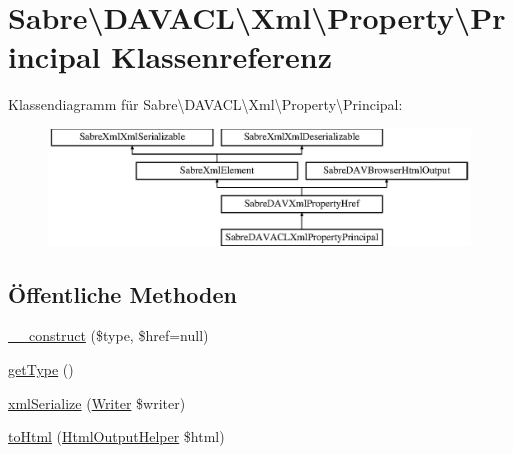 \hypertarget{class_sabre_1_1_d_a_v_a_c_l_1_1_xml_1_1_property_1_1_principal}{}\section{Sabre\textbackslash{}D\+A\+V\+A\+CL\textbackslash{}Xml\textbackslash{}Property\textbackslash{}Principal Klassenreferenz}
\label{class_sabre_1_1_d_a_v_a_c_l_1_1_xml_1_1_property_1_1_principal}
Klassendiagramm für Sabre\textbackslash{}D\+A\+V\+A\+CL\textbackslash{}Xml\textbackslash{}Property\textbackslash{}Principal\+:\begin{figure}[H]
\begin{center}
\leavevmode
\includegraphics[height=3.085400cm]{class_sabre_1_1_d_a_v_a_c_l_1_1_xml_1_1_property_1_1_principal}
\end{center}
\end{figure}
\subsection*{Öffentliche Methoden}
\begin{DoxyCompactItemize}
\item 
\mbox{\hyperlink{class_sabre_1_1_d_a_v_a_c_l_1_1_xml_1_1_property_1_1_principal_ac736f88ab664e591f726dc2b05b475b3}{\+\_\+\+\_\+construct}} (\$type, \$href=null)
\item 
\mbox{\hyperlink{class_sabre_1_1_d_a_v_a_c_l_1_1_xml_1_1_property_1_1_principal_ad374ce859c1431bd0267aa977e6ee37d}{get\+Type}} ()
\item 
\mbox{\hyperlink{class_sabre_1_1_d_a_v_a_c_l_1_1_xml_1_1_property_1_1_principal_aeaa0152eca3d1706c56e30964c8f4ff3}{xml\+Serialize}} (\mbox{\hyperlink{class_sabre_1_1_xml_1_1_writer}{Writer}} \$writer)
\item 
\mbox{\hyperlink{class_sabre_1_1_d_a_v_a_c_l_1_1_xml_1_1_property_1_1_principal_a4b9de9a2e6d5a1cdb08a9da3199a1cca}{to\+Html}} (\mbox{\hyperlink{class_sabre_1_1_d_a_v_1_1_browser_1_1_html_output_helper}{Html\+Output\+Helper}} \$html)
\end{DoxyCompactItemize}
